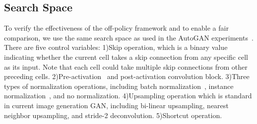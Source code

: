 \documentclass[runningheads]{llncs}
\begin{document}
\subsection{Search Space} 
To verify the effectiveness of the off-policy framework and to enable a  fair comparison, we use the same search space as used in the AutoGAN experiments~\cite{gong2019autogan}. There are five control variables: 1)Skip operation, which is a binary value indicating whether the current cell takes a skip connection from any specific cell as its input. Note that each cell could take multiple skip connections from other preceding cells. 2)Pre-activation~\cite{he2016identity} and post-activation convolution block. 3)Three types of normalization operations, including batch normalization~\cite{ioffe2015batch}, instance normalization~\cite{ulyanov2016instance}, and no normalization. 4)Upsampling operation which is standard in current image generation GAN, including bi-linear upsampling, nearest neighbor upsampling, and stride-2 deconvolution. 5)Shortcut operation.
\end{document}
